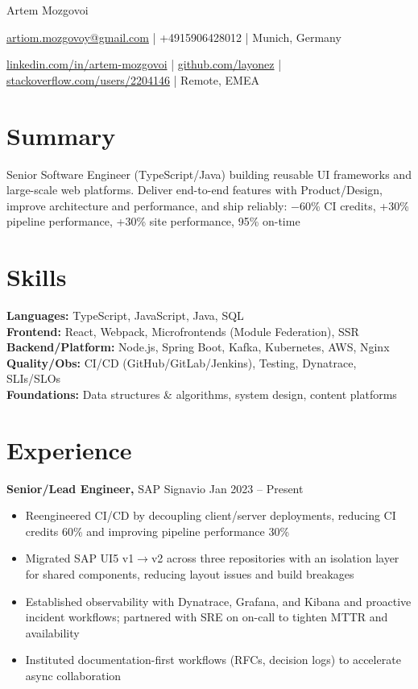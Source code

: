 \documentclass[11pt]{article}
\begin{document}
\centerline{\Huge Artem Mozgovoi}

\vspace{5pt}

\centerline{\href{mailto:artiom.mozgovoy@gmail.com}{artiom.mozgovoy@gmail.com} | +4915906428012 | Munich, Germany}
\centerline{\href{https://www.linkedin.com/in/artem-mozgovoi}{linkedin.com/in/artem-mozgovoi} | \href{https://github.com/layonez}{github.com/layonez} | \href{https://stackoverflow.com/users/2204146/layonez}{stackoverflow.com/users/2204146} | Remote, EMEA}

\vspace{-10pt}

\section*{Summary}
Senior Software Engineer (TypeScript/Java) building reusable UI frameworks and large-scale web platforms. Deliver end-to-end features with Product/Design, improve architecture and performance, and ship reliably: $-$60\% CI credits, +30\% pipeline performance, +30\% site performance, 95\% on-time

\section*{Skills}
\textbf{Languages:} TypeScript, JavaScript, Java, SQL \\
\textbf{Frontend:} React, Webpack, Microfrontends (Module Federation), SSR \\
\textbf{Backend/Platform:} Node.js, Spring Boot, Kafka, Kubernetes, AWS, Nginx \\
\textbf{Quality/Obs:} CI/CD (GitHub/GitLab/Jenkins), Testing, Dynatrace, SLIs/SLOs \\
\textbf{Foundations:} Data structures \& algorithms, system design, content platforms

\vspace{-6.5pt}

\section*{Experience}
\textbf{Senior/Lead Engineer,} SAP Signavio \hfill Jan 2023 -- Present \\
\vspace{-9pt}
\begin{itemize}
  \item Reengineered CI/CD by decoupling client/server deployments, reducing CI credits 60\% and improving pipeline performance 30\%
  \item Migrated SAP UI5 v1$\to$v2 across three repositories with an isolation layer for shared components, reducing layout issues and build breakages
  \item Established observability with Dynatrace, Grafana, and Kibana and proactive incident workflows; partnered with SRE on on-call to tighten MTTR and availability
  \item Instituted documentation-first workflows (RFCs, decision logs) to accelerate async collaboration
\end{itemize}
\end{document}
